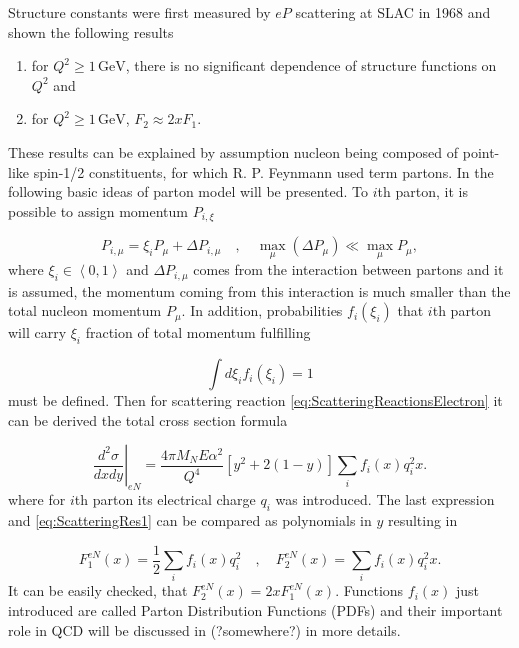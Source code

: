 \documentclass[a4paper,11pt]{report}
\newcommand{\GeV}{\,\text{GeV}}
\begin{document}
Structure constants were first measured by $eP$ scattering at SLAC in 1968
\cite{ePScattering} and shown the following results
\begin{enumerate}
  \item for $Q^2 \geq 1\GeV$, there is no significant dependence of structure
    functions on $Q^2$ and
  \item for $Q^2 \geq 1\GeV$, $F_2 \approx 2xF_1$.
\end{enumerate}
These results can be explained by assumption nucleon being composed of
point-like spin-1/2 constituents, for which R. P. Feynmann used term partons. In
the following basic ideas of parton model will be presented. To $i$th parton, it
is possible to assign momentum $P_{i,\xi}$

\begin{equation}
  P_{i,\mu} = \xi_i P_\mu + \Delta P_{i,\mu} 
    \quad , \quad \max_\mu (\Delta P_\mu) \ll \max_\mu P_\mu,
  \label{PartonsMomentumDistriburtionAssumption}
\end{equation}
where $\xi_i \in \left< 0, 1 \right>$ and $\Delta P_{i,\mu}$ comes from the
interaction between partons and it is assumed, the momentum coming from this
interaction is much smaller than the total nucleon momentum $P_\mu$. In
addition, probabilities $f_i(\xi_i)$ that $i$th parton will carry $\xi_i$
fraction of total momentum fulfilling

\begin{equation}
  \int d\xi_i f_i(\xi_i) = 1
  \label{eq:PartonDensityFunctionsNormalization}
\end{equation}
must be defined. Then for scattering reaction
\eqref{eq:ScatteringReactionsElectron} it can be derived the total cross section
formula

\begin{equation}
  \left. \frac{d^2\sigma}{dxdy} \right|_{eN} =
  \frac{4 \pi M_N E \alpha^2}{Q^4} \left[ y^2 + 2 ( 1 - y ) \right]
  \sum_i f_i(x) q_i^2 x.
  \label{eg:ScatteringRes2}
\end{equation}
where for $i$th parton its electrical charge $q_i$ was introduced. The last
expression and \eqref{eq:ScatteringRes1} can be compared as polynomials in $y$
resulting in

\begin{equation}
  F_1^{eN}(x) = \frac{1}{2} \sum_i f_i(x)q_i^2
  \quad , \quad
  F_2^{eN}(x) = \sum_i f_i(x) q_i^2 x.
  \label{eq:StructureFunctionAndPDF}
\end{equation}
It can be easily checked, that $F_2^{eN}(x) = 2 x F_1^{eN}(x)$. Functions
$f_i(x)$ just introduced are called Parton Distribution Functions (PDFs) and their
important role in QCD will be discussed in (?somewhere?) in more details.
\end{document}
